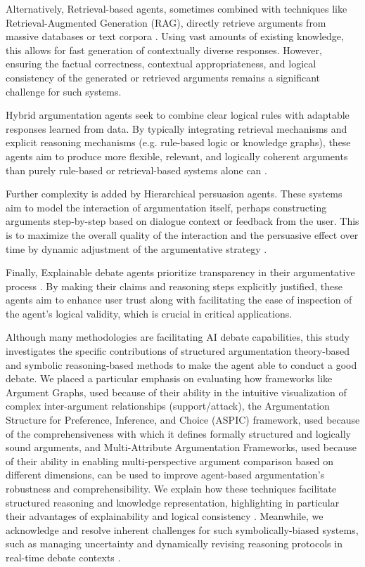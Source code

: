 \documentclass[conference]{IEEEtran}
\begin{document}
Alternatively, Retrieval-based agents, sometimes combined with techniques like Retrieval-Augmented Generation (RAG), directly retrieve arguments from massive databases or text corpora \cite{kulatska2019arguebot}. Using vast amounts of existing knowledge, this allows for fast generation of contextually diverse responses. However, ensuring the factual correctness, contextual appropriateness, and logical consistency of the generated or retrieved arguments remains a significant challenge for such systems.

Hybrid argumentation agents seek to combine clear logical rules with adaptable responses learned from data. By typically integrating retrieval mechanisms and explicit reasoning mechanisms (e.g. rule-based logic or knowledge graphs), these agents aim to produce more flexible, relevant, and logically coherent arguments than purely rule-based or retrieval-based systems alone can \cite{kulatska2019arguebot}.

Further complexity is added by Hierarchical persuasion agents. These systems aim to model the interaction of argumentation itself, perhaps constructing arguments step-by-step based on dialogue context or feedback from the user. This is to maximize the overall quality of the interaction and the persuasive effect over time by dynamic adjustment of the argumentative strategy \cite{sakai2020hierarchical}.

Finally, Explainable debate agents prioritize transparency in their argumentative process \cite{ali2022supportattack}. By making their claims and reasoning steps explicitly justified, these agents aim to enhance user trust along with facilitating the ease of inspection of the agent's logical validity, which is crucial in critical applications.

Although many methodologies are facilitating AI debate capabilities, this study investigates the specific contributions of structured argumentation theory-based and symbolic reasoning-based methods to make the agent able to conduct a good debate. We placed a particular emphasis on evaluating how frameworks like Argument Graphs, used because of their ability in the intuitive visualization of complex inter-argument relationships (support/attack), the Argumentation Structure for Preference, Inference, and Choice (ASPIC) framework, used because of the comprehensiveness with which it defines formally structured and logically sound arguments, and Multi-Attribute Argumentation Frameworks, used because of their ability in enabling multi-perspective argument comparison based on different dimensions, can be used to improve agent-based argumentation's robustness and comprehensibility. We explain how these techniques facilitate structured reasoning and knowledge representation, highlighting in particular their advantages of explainability and logical consistency \cite{kasif2024trilogy}. Meanwhile, we acknowledge and resolve inherent challenges for such symbolically-biased systems, such as managing uncertainty and dynamically revising reasoning protocols in real-time debate contexts \cite{kasif2024trilogy}.
\end{document}
